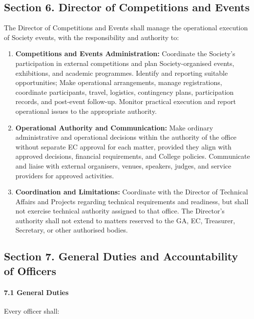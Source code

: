 \documentclass[a4paper]{article}
\begin{document}
\subsection*{Section 6. Director of Competitions and Events}
The Director of Competitions and Events shall manage the operational execution of Society events, with the responsibility and authority to:
\begin{enumerate}
  \item \textbf{Competitions and Events Administration:} Coordinate the Society's participation in external competitions and plan Society-organised events, exhibitions, and academic programmes. Identify and reporting suitable opportunities; Make operational arrangements, manage registrations, coordinate participants, travel, logistics, contingency plans, participation records, and post-event follow-up. Monitor practical execution and report operational issues to the appropriate authority.
  \item \textbf{Operational Authority and Communication:} Make ordinary administrative and operational decisions within the authority of the office without separate EC approval for each matter, provided they align with approved decisions, financial requirements, and College policies. Communicate and liaise with external organisers, venues, speakers, judges, and service providers for approved activities.
  \item \textbf{Coordination and Limitations:} Coordinate with the Director of Technical Affairs and Projects regarding technical requirements and readiness, but shall not exercise technical authority assigned to that office. The Director’s authority shall not extend to matters reserved to the GA, EC, Treasurer, Secretary, or other authorised bodies.
\end{enumerate}

\subsection*{Section 7. General Duties and Accountability of Officers}

\paragraph{7.1 General Duties}
Every officer shall:
\end{document}
